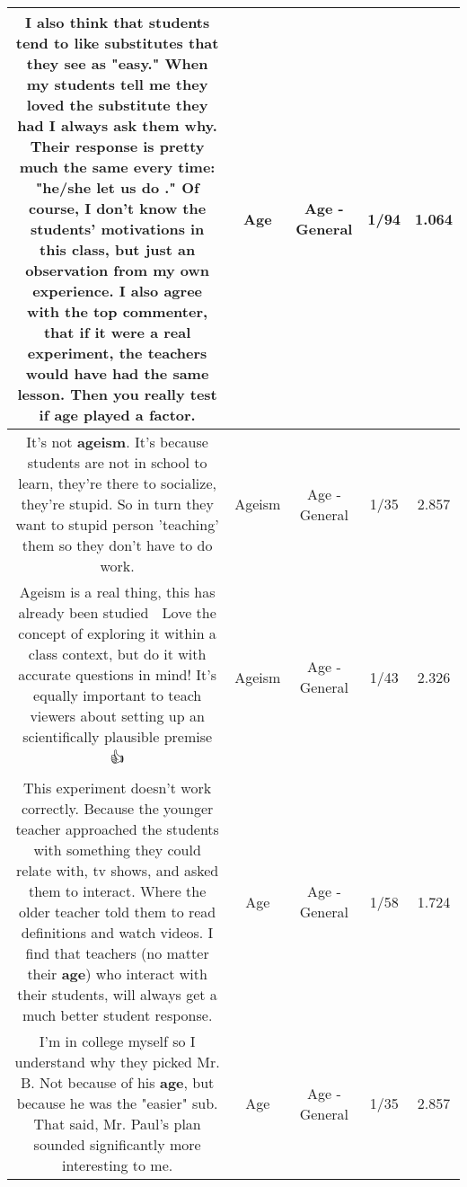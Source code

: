\documentclass[11pt]{article}
\newlength\mylength
\begin{document}
\begin{center}
\begin{longtable}{|C{.65\mylength}|C{.30\mylength}|C{.12\mylength}|C{.12\mylength}|C{.12\mylength}|}
  \small I also think that students tend to like substitutes that they see as "easy." When my students tell me they loved the substitute they had I always ask them why. Their response is pretty much the same every time: "he/she let us do  ."  Of course, I don't know the students' motivations in this class, but just an observation from my own experience. I also agree with the top commenter, that if it were a real experiment, the teachers would have had the same lesson. Then you really test if \textbf{age} played a factor.\normalsize   & Age & Age - General & 1/94 & 1.064 \\  \hline
  \small It's not \textbf{ageism}.  It's because students are not in school to learn, they're there to socialize, they're stupid.  So in turn they want to stupid person 'teaching' them so they don't have to do work.\normalsize   & Ageism & Age - General & 1/35 & 2.857 \\  \hline
  \small Ageism is a real thing, this has already been studied 🤔 Love the concept of exploring it within a class context, but do it with accurate questions in mind! It's equally important to teach viewers about setting up an scientifically plausible premise 👍\normalsize   & Ageism & Age - General & 1/43 & 2.326 \\  \hline
  \small This experiment doesn't work correctly. Because the younger teacher approached the students with something they could relate with, tv shows, and asked them to interact. Where the older teacher told them to read definitions and watch videos. I find that teachers (no matter their \textbf{age}) who interact with their students, will always get a much better student response.\normalsize   & Age & Age - General & 1/58 & 1.724 \\  \hline
  \small I'm in college myself so I understand why they picked Mr. B. Not because of his \textbf{age}, but because he was the "easier" sub. That said, Mr. Paul's plan sounded significantly more interesting to me.\normalsize   & Age & Age - General & 1/35 & 2.857 \\  \hline

\end{longtable}
\end{center}
\end{document}

